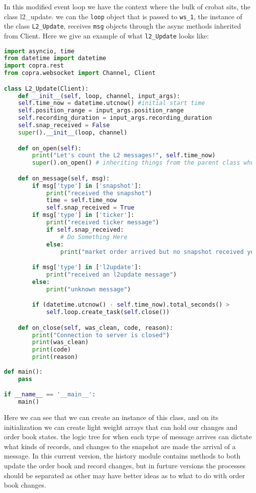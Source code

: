 In this modified event loop we have the context where the bulk of crobat sits, the class l2\_update. we can the \texttt{loop} object that is passed to \texttt{ws\_1}, the instance of the class \texttt{L2\_Update}, receives \texttt{msg} objects through the async methods inherited from Client. Here we give an example of what \texttt{l2\_Update} looks like:\newpage

\begin{lstlisting}[language=Python]
import asyncio, time
from datetime import datetime
import copra.rest
from copra.websocket import Channel, Client

class L2_Update(Client):
	def __init__(self, loop, channel, input_args):
	self.time_now = datetime.utcnow() #initial start time
	self.position_range = input_args.position_range
	self.recording_duration = input_args.recording_duration
	self.snap_received = False
	super().__init__(loop, channel)

	def on_open(self):
		print("Let's count the L2 messages!", self.time_now)
		super().on_open() # inheriting things from the parent class who really knows    

	def on_message(self, msg):
		if msg['type'] in ['snapshot']:
			print("received the snapshot")
			time = self.time_now
			self.snap_received = True
		if msg['type'] in ['ticker']:
			print("received ticker message")
			if self.snap_received:
				# Do Something Here
			else:
				print("market order arrived but no snapshot received yet")

		if msg['type'] in ['l2update']:
			print("received an l2update message")
		else:
			print("unknown message")

		if (datetime.utcnow() - self.time_now).total_seconds() > 		self.recording_duration:
			self.loop.create_task(self.close()) 

	def on_close(self, was_clean, code, reason):
		print("Connection to server is closed")
		print(was_clean)
		print(code)
		print(reason)
		
def main():
	pass

if __name__ == '__main__':
	main()
\end{lstlisting}

Here we can see that we can create an instance of this class, and on its initialization we can create light weight arrays that can hold our changes and order book states. the logic tree for when each type of message arrives can dictate what kinds of records, and changes to the snapshot are made the arrival of a message. In this current version, the history module contains methods to both update the order book and record changes, but in furture versions the processes should be separated as other may have better ideas as to what to do with order book changes. 